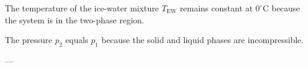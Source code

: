 The temperature of the ice-water mixture \( T_{\text{EW}} \) remains constant at \( 0^\circ\text{C} \) because the system is in the two-phase region.  

The pressure \( p_2 \) equals \( p_1 \) because the solid and liquid phases are incompressible.  

---